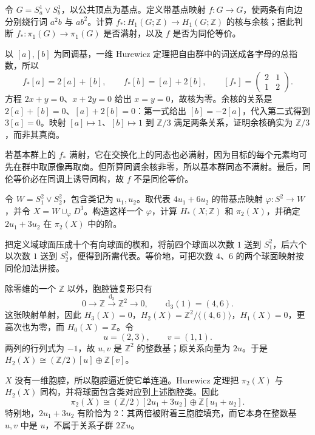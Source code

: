 \begin{exercise}\label{g2:ex:hurewicz-graph-map}
	令 \(G=S^1_a\vee S^1_b\)，以公共顶点为基点。定义带基点映射 \(f:G\to G\)，使两条有向边分别绕行词 \(a^2b\) 与 \(ab^2\)。计算 \(f_*:H_1(G;\mathbb Z)\to H_1(G;\mathbb Z)\) 的核与余核；据此判断 \(f_*:\pi_1(G)\to\pi_1(G)\) 是否满射，以及 \(f\) 是否为同伦等价。
\end{exercise}
\begin{solution}
	以 \([a],[b]\) 为同调基，一维 Hurewicz 定理把自由群中的词送成各字母的总指数，所以
	\[
		f_*[a]=2[a]+[b],\qquad f_*[b]=[a]+2[b],\qquad
		[f_*]=\begin{pmatrix}2&1\\1&2\end{pmatrix}.
	\]
	方程 \(2x+y=0\)、\(x+2y=0\) 给出 \(x=y=0\)，故核为零。余核的关系是 \(2[a]+[b]=0\)、\([a]+2[b]=0\)：第一式给出 \([b]=-2[a]\)，代入第二式得到 \(3[a]=0\)。映射 \([a]\mapsto1\)、\([b]\mapsto1\) 到 \(\mathbb Z/3\) 满足两条关系，证明余核确实为 \(\mathbb Z/3\)，而非其真商。

	若基本群上的 \(f_*\) 满射，它在交换化上的同态也必满射，因为目标的每个元素均可先在群中取原像再取商。但所算同调余核非零，所以基本群同态不满射。最后，同伦等价必在同调上诱导同构，故 \(f\) 不是同伦等价。
\end{solution}

\begin{exercise}\label{g2:ex:hurewicz-two-sphere-relation}
	令 \(W=S^2_1\vee S^2_2\)，包含类记为 \(u_1,u_2\)。取代表 \(4u_1+6u_2\) 的带基点映射 \(\varphi:S^2\to W\)，并令 \(X=W\cup_\varphi D^3\)。构造这样一个 \(\varphi\)，计算 \(H_*(X;\mathbb Z)\) 和 \(\pi_2(X)\)，并确定 \(2u_1+3u_2\) 在 \(\pi_2(X)\) 中的阶。
\end{exercise}
\begin{solution}
	把定义域球面压成十个有向球面的楔和，将前四个球面以次数 \(1\) 送到 \(S^2_1\)，后六个以次数 \(1\) 送到 \(S^2_2\)，便得到所需代表。等价地，可把次数 \(4\)、\(6\) 的两个球面映射按同伦加法拼接。

	除零维的一个 \(\mathbb Z\) 以外，胞腔链复形只有
	\[
		0\longrightarrow\mathbb Z\xrightarrow{\mathrm d_3}\mathbb Z^2\longrightarrow0,
		\qquad\mathrm d_3(1)=(4,6).
	\]
	这张映射单射，因此 \(H_3(X)=0\)，\(H_2(X)=\mathbb Z^2/\langle(4,6)\rangle\)，\(H_1(X)=0\)，更高次也为零，而 \(H_0(X)=\mathbb Z\)。令
	\[
		u=(2,3),\qquad v=(1,1).
	\]
	两列的行列式为 \(-1\)，故 \(u,v\) 是 \(\mathbb Z^2\) 的整数基；原关系向量为 \(2u\)。于是 \(H_2(X)\cong(\mathbb Z/2)[u]\oplus\mathbb Z[v]\)。

	\(X\) 没有一维胞腔，所以胞腔逼近使它单连通。Hurewicz 定理把 \(\pi_2(X)\) 与 \(H_2(X)\) 同构，并将球面包含类对应到上述胞腔类。因此
	\[
		\pi_2(X)\cong(\mathbb Z/2)[2u_1+3u_2]\oplus\mathbb Z[u_1+u_2].
	\]
	特别地，\(2u_1+3u_2\) 有阶恰为 \(2\)：其两倍被附着三胞腔填充，而它本身在整数基 \(u,v\) 中是 \(u\)，不属于关系子群 \(2\mathbb Zu\)。
\end{solution}

